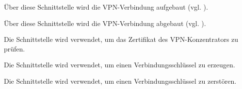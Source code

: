 
Über diese Schnittstelle wird die VPN-Verbindung aufgebaut
(vgl. ).


Über diese Schnittstelle wird die VPN-Verbindung abgebaut (vgl. ).


Die Schnittstelle  wird
verwendet, um das Zertifikat des VPN-Konzentrators zu prüfen.


Die Schnittstelle  wird
verwendet, um einen Verbindungsschlüssel zu erzeugen.


Die Schnittstelle  wird
verwendet, um einen Verbindungsschlüssel zu zerstören.


